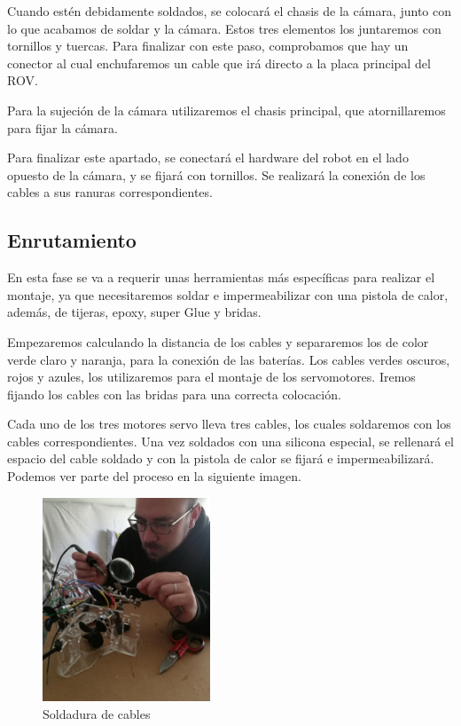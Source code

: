 Cuando estén debidamente soldados, se colocará el chasis de la cámara, junto con lo que acabamos de soldar y la cámara. Estos tres elementos los juntaremos con tornillos y tuercas. Para finalizar con este paso, comprobamos que hay un conector al cual enchufaremos un cable que irá directo a la placa principal del ROV.

Para la sujeción de la cámara utilizaremos el chasis principal, que atornillaremos para fijar la cámara. 

Para finalizar este apartado, se conectará el hardware del robot en el lado opuesto de la cámara, y se fijará con tornillos. Se realizará la conexión de los cables a sus ranuras correspondientes.

\subsection{Enrutamiento}
\label{subsec:enrutamiento}

En esta fase se va a requerir unas herramientas más específicas para realizar el montaje, ya que necesitaremos soldar e impermeabilizar con una pistola de calor, además, de tijeras, epoxy, super Glue y bridas.

Empezaremos calculando la distancia de los cables y separaremos los de color verde claro y naranja, para la conexión de las baterías. Los cables verdes oscuros, rojos y azules, los utilizaremos para el montaje de los servomotores. Iremos fijando los cables con las bridas para una correcta colocación.

Cada uno de los tres motores servo lleva tres cables, los cuales soldaremos con los cables correspondientes. Una vez soldados con una silicona especial, se rellenará el espacio del cable soldado y con la pistola de calor se fijará e impermeabilizará. Podemos ver parte del proceso en la siguiente imagen.


\begin{figure} [hbtp]
  \begin{center}
    \includegraphics[width=5cm]{img/cap3/3_3/soldar}
  \end{center}
  \caption{Soldadura de cables}
  \label{fig:soldar}
\end{figure}

